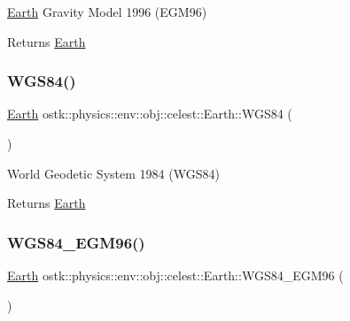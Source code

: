 \hyperlink{classostk_1_1physics_1_1env_1_1obj_1_1celest_1_1_earth}{Earth} Gravity Model 1996 (E\+G\+M96) 

\begin{DoxyReturn}{Returns}
\hyperlink{classostk_1_1physics_1_1env_1_1obj_1_1celest_1_1_earth}{Earth} 
\end{DoxyReturn}
\mbox{\label{classostk_1_1physics_1_1env_1_1obj_1_1celest_1_1_earth_ad2c89b180e92bdc6c525ce7c065400aa}} 
\subsubsection{\texorpdfstring{W\+G\+S84()}{WGS84()}}
{\footnotesize\ttfamily \hyperlink{classostk_1_1physics_1_1env_1_1obj_1_1celest_1_1_earth}{Earth} ostk\+::physics\+::env\+::obj\+::celest\+::\+Earth\+::\+W\+G\+S84 (\begin{DoxyParamCaption}{ }\end{DoxyParamCaption})\hspace{0.3cm}{\ttfamily [static]}}



World Geodetic System 1984 (W\+G\+S84) 

\begin{DoxyReturn}{Returns}
\hyperlink{classostk_1_1physics_1_1env_1_1obj_1_1celest_1_1_earth}{Earth} 
\end{DoxyReturn}
\mbox{\label{classostk_1_1physics_1_1env_1_1obj_1_1celest_1_1_earth_a2c2af2af178d0eb24391a1ab19baa36a}} 
\subsubsection{\texorpdfstring{W\+G\+S84\+\_\+\+E\+G\+M96()}{WGS84\_EGM96()}}
{\footnotesize\ttfamily \hyperlink{classostk_1_1physics_1_1env_1_1obj_1_1celest_1_1_earth}{Earth} ostk\+::physics\+::env\+::obj\+::celest\+::\+Earth\+::\+W\+G\+S84\+\_\+\+E\+G\+M96 (\begin{DoxyParamCaption}{ }\end{DoxyParamCaption})\hspace{0.3cm}{\ttfamily [static]}}



